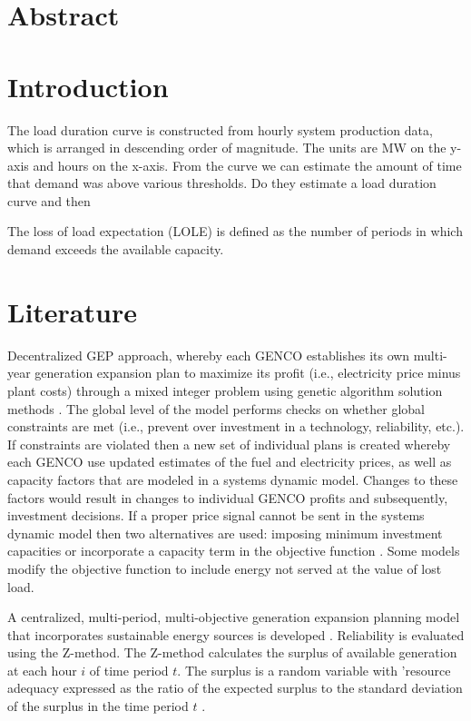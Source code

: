 \documentclass[10pt]{amsart}
\begin{document}
\section{Abstract}

\section{Introduction}
The load duration curve is constructed from hourly system production data, which is arranged in descending order of magnitude. 
The units are MW on the y-axis and hours on the x-axis. 
From the curve we can estimate the amount of time that demand was above various thresholds. 
Do they estimate a load duration curve and then 

The loss of load expectation (LOLE) is defined as the number of periods in which demand exceeds the available capacity.


\section{Literature}
Decentralized GEP approach, whereby each GENCO establishes its own multi-year generation expansion plan to maximize its profit (i.e., electricity price minus plant costs) through a mixed integer problem using genetic algorithm solution methods \parencite{pereira2011generation}. 
The global level of the model performs checks on whether global constraints are met (i.e., prevent over investment in a technology, reliability, etc.). 
If constraints are violated then a new set of individual plans is created whereby each GENCO use updated estimates of the fuel and electricity prices, as well as capacity factors that are modeled in a systems dynamic model. 
Changes to these factors would result in changes to individual GENCO profits and subsequently, investment decisions. 
If a proper price signal cannot be sent in the systems dynamic model then two alternatives are used: imposing minimum investment capacities or incorporate a capacity term in the objective function \parencite{pereira2011generation}. 
Some models modify the objective function to include energy not served at the value of lost load.

A centralized, multi-period, multi-objective generation expansion planning model that incorporates sustainable energy sources is developed \parencite{aghaei:2013aa}.  
Reliability is evaluated using the Z-method.
The Z-method calculates the surplus of available generation at each hour $i$ of time period $t$. 
The surplus is a random variable with 'resource adequacy expressed as the ratio of the expected surplus to the standard deviation of the surplus in the time period $t$ \parencite{aghaei:2013aa}.
\end{document}
